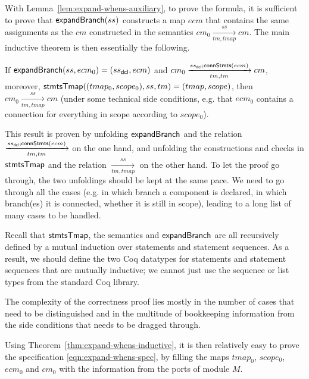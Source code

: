With Lemma~\ref{lem:expand-whens-auxiliary}, to prove the formula, it is sufficient to prove that ${\sf expandBranch}(ss)$ constructs a map $ecm$
that contains the same assignments as the $cm$ constructed in the semantics $cm_0 \xrightarrow[tm, tmap]{ss} cm$.
%
The main inductive theorem is then essentially the following.
\begin{theorem}\label{thm:expand-whens-inductive}
If $\expandbranch(ss, \linebreak[0] ecm_0) = (ss_{\sf dcl}, ecm)$ and $cm_0 \xrightarrow[tm, tm]{ss_{\sf dcl} ; {\sf connStmts}(ecm)} cm$, moreover, ${\sf stmtsTmap}((tmap_0, scope_0), ss, tm) = (tmap, scope)$,
then $cm_0 \xrightarrow[tm, tmap]{ss} cm$
(under some technical side conditions, e.g. that $ecm_0$ contains a connection for everything in scope according to $scope_0$).
\end{theorem}
%
This result is proven by unfolding ${\sf expandBranch}$ and the relation $\xrightarrow[tm, tm]{ss_{\sf dcl} ; {\sf connStmts}(ecm)}$ on the one hand, and unfolding the constructions and checks in ${\sf stmtsTmap}$ and the relation $\xrightarrow[tm, tmap]{ss}$ on the other hand. To let the proof go through, the two unfoldings should be kept at the same pace.
We need to go through all the cases (e.g. in which branch a component is declared, in which branch(es) it is connected, whether it is still in scope),
leading to a long list of many cases to be handled.

Recall that ${\sf stmtsTmap}$, the semantics and ${\sf expandBranch}$ are all recursively defined by a mutual induction over statements and statement sequences.
As a result, we should define the two Coq datatypes for statements and statement sequences that are mutually inductive;
we cannot just use the sequence or list types from the standard Coq library.

The complexity of the correctness proof lies mostly in the number of cases that need to be distinguished
and in the multitude of bookkeeping information from the side conditions that needs to be dragged through.

Using Theorem~\ref{thm:expand-whens-inductive},
it is then relatively easy to prove the specification \eqref{eqn:expand-whens-spec},
by filling the maps $tmap_0$, $scope_0$, $ecm_0$ and $cm_0$ with the information from the ports of module $M$.


